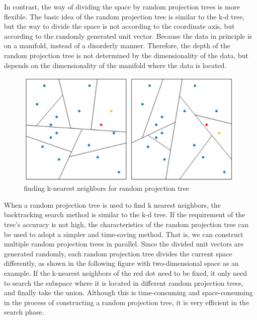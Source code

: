 \noindent In contrast, the way of dividing the space by random projection trees is more flexible. The basic idea of the random projection tree is similar to the k-d tree, but the way to divide the space is not according to the coordinate axis, but according to the randomly generated unit vector. Because the data in principle is on a manifold, instead of a disorderly manner. Therefore, the depth of the random projection tree is not determined by the dimensionality of the data, but depends on the dimensionality of the manifold where the data is located\cite{ref6}.\\

\begin{figure}[ht]

\centering
\includegraphics[scale=0.85]{images/image_largevis_random_projection_tree_2.PNG}
\caption{finding k-nearest neighbors for random projection tree}
\label{fig:label}
\end{figure}

\noindent When a random projection tree is used to find k nearest neighbors, the backtracking search method is similar to the k-d tree. If the requirement of the tree's accuracy is not high, the characteristics of the random projection tree can be used to adopt a simpler and time-saving method. That is, we can construct multiple random projection trees in parallel. Since the divided unit vectors are generated randomly, each random projection tree divides the current space differently, as shown in the following figure with two-dimensional space as an example. If the k-nearest neighbors of the red dot need to be fixed, it only need to search the subspace where it is located in different random projection trees, and finally take the union. Although this is time-consuming and space-consuming in the process of constructing a random projection tree, it is very efficient in the search phase.

